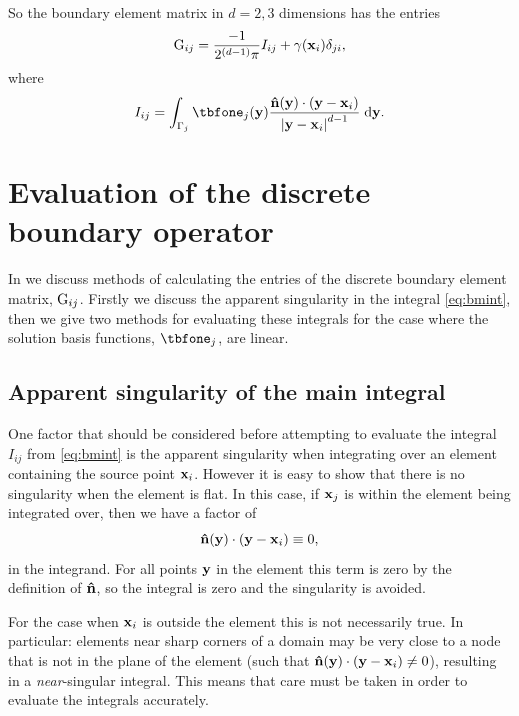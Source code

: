 \newcommand{\bminta}{I}
\newcommand{\bmint}{\bminta_{ij}}

So the boundary element matrix in $d=2,3$ dimensions has the entries
\begin{equation}
  \label{eq:19}
  \bm_{\ibasis\ibasisb} =\frac{-1}{2^{(d-1)} \pi} \bmint
    + \gamma(\xv_\ibasis)\delta_{\ibasisb\ibasis},
\end{equation}
where
\begin{equation}
  \bmint = \int_{\boundd_\ibasisb} \tbfone_{\ibasisb}(\yv) \frac{\nv(\yv) \cdot (\yv - \xv_\ibasis)}{\abs{\yv - \xv_\ibasis} ^{d-1}} \d \yv.
\label{eq:bmint}
\end{equation}


\section{Evaluation of the discrete boundary operator}
\label{sec:calc-integr-i_bm}

In  we discuss methods of calculating the entries of the discrete boundary element matrix, ${\mathbf{\mathrm{G}}}_{{i}{j}}$.
Firstly we discuss the apparent singularity in the integral \cref{eq:bmint}, then we give two methods for evaluating these integrals for the case where the solution basis functions, $\tbfone_j$, are linear.

\subsection{Apparent singularity of the main integral}
\label{sec:bem-singularity}

One factor that should be considered before attempting to evaluate the integral $\bmint$ from \cref{eq:bmint} is the apparent singularity when integrating over an element containing the source point $\boldsymbol{\mathrm{x}}_{i}$.
However it is easy to show that there is no singularity when the element is flat.
In this case, if $\boldsymbol{\mathrm{x}}_{j}$ is within the element being integrated over, then we have a factor of
\begin{equation}
  \label{eq:7}
  \boldsymbol{\mathrm{\hat{n}}}(\boldsymbol{\mathrm{y}}) \cdot (\boldsymbol{\mathrm{y}} - \boldsymbol{\mathrm{x}}_i) \equiv 0,
\end{equation}
in the integrand.
For all points $\boldsymbol{\mathrm{y}}$ in the element this term is zero by the definition of $\boldsymbol{\mathrm{\hat{n}}}$, so the integral is zero and the singularity is avoided.

For the case when $\boldsymbol{\mathrm{x}}_i$ is outside the element this is not necessarily true.
In particular: elements near sharp corners of a domain may be very close to a node that is not in the plane of the element (\ie such that $\boldsymbol{\mathrm{\hat{n}}}(\boldsymbol{\mathrm{y}}) \cdot (\boldsymbol{\mathrm{y}} - \boldsymbol{\mathrm{x}}_i) \neq 0$), resulting in a \emph{near}-singular integral.
This means that care must be taken in order to evaluate the integrals accurately.


